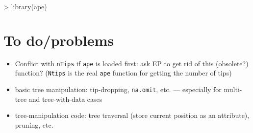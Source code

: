 \documentclass{article}
\newcommand{\code}[1]{{{\tt #1}}}
\begin{document}
\begin{Schunk}
\begin{Sinput}
> library(ape)
\end{Sinput}
\end{Schunk}
\section{To do/problems}


\begin{itemize}
\item Conflict with \code{nTips} if \code{ape} is loaded first:
ask EP to get rid of this (obsolete?) function? (\code{Ntips}
is the real \code{ape} function for getting the number of tips)
\item basic tree manipulation: tip-dropping, \code{na.omit}, etc. --- 
especially for multi-tree and tree-with-data cases
\item tree-manipulation code: tree traversal (store current
position as an attribute), pruning, etc.
\end{itemize}
\end{document}
